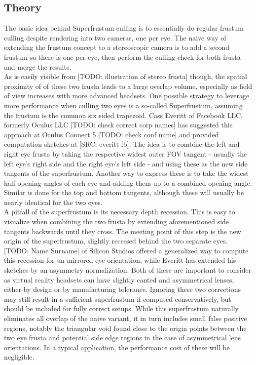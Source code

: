{\subsection{Theory}
The basic idea behind Superfrustum culling is to essentially do regular frustum culling despite rendering into two cameras, one per eye. The naive way of extending the frustum concept to a stereoscopic camera is to add a second frustum so there is one per eye, then perform the culling check for both frusta and merge the results. \\
As is easily visible from [TODO: illustration of stereo frusta] though, the spatial proximity of of these two frusta leads to a large overlap volume, especially as field of view increases with more advanced headsets. One possible strategy to leverage more performance when culling two eyes is a so-called Superfrustum, assuming the frustum is the common six sided trapezoid. Cass Everitt of Facebook LLC, formerly Oculus LLC [TODO: check correct corp names] has suggested this approach at Oculus Connect 5 [TODO: check conf name] and provided computation sketches at [SRC: everitt fb]. The idea is to combine the left and right eye frusta by taking the respective widest outer FOV tangent - usually the left eye's right side and the right eye's left side - and using these as the new side tangents of the superfrustum. Another way to express these is to take the widest half opening angles of each eye and adding them up to a combined opening angle. Similar is done for the top and bottom tangents, although these will usually be nearly identical for the two eyes. \\
A pitfall of the superfrustum is its necessary depth recession. This is easy to visualize when combining the two frusta by extending aforementioned side tangents backwards until they cross. The meeting point of this step is the new origin of the superfrustum, slightly recessed behind the two separate eyes. 
[TODO: Name Surname] of Silicon Studios offered a generalized way to compute this recession for un-mirrored eye orientation, while Everitt has extended his sketches by an asymmetry normalization. Both of these are important to consider as virtual reality headsets can have slightly canted and asymmetrical lenses, either by design or by manufacturing tolerance. Ignoring these two corrections may still result in a sufficient superfrustum if computed conservatively, but should be included for fully correct setups. 
While this superfrustum naturally eliminates all overlap of the naive variant, it in turn includes small false positive regions, notably the triangular void found close to the origin points between the two eye frusta and potential side edge regions in the case of asymmetrical lens orientations. In a typical application, the performance cost of these will be negligible. \\

}
